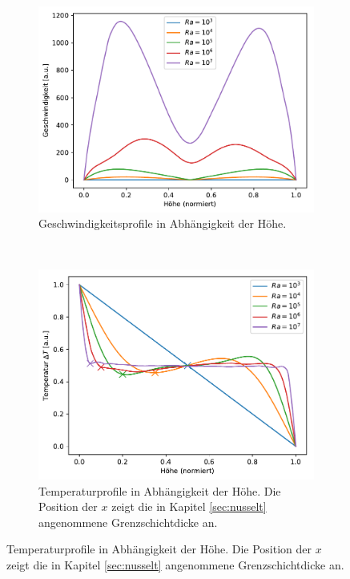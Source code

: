 \documentclass[12pt,a4paper,titlepage,headinclude]{scrartcl}
\numberwithin{equation}{subsection}
\begin{document}
\begin{figure}[!ht]
	\centering
    \begin{subfigure}[t]{0.49\textwidth}
        \centering
	\includegraphics[width=1\linewidth]{V_sim}
	\caption{Geschwindigkeitsprofile in Abhängigkeit der Höhe.}
	\label{fig:v_num}
    \end{subfigure}%
    ~ 
    \begin{subfigure}[t]{0.49\textwidth}
        \centering
	\includegraphics[width=1\linewidth]{T_sim}
	\caption{Temperaturprofile in Abhängigkeit der Höhe. Die Position der $x$ zeigt die in Kapitel \ref{sec:nusselt} angenommene Grenzschichtdicke an.}
	\label{fig:T_num}
    \end{subfigure}

\end{figure}
\end{document}
